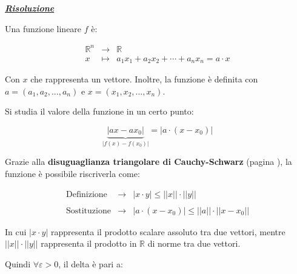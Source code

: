\documentclass[a4paper]{article}
\begin{document}
	\noindent
	\textcolor{Green4}{\textbf{\underline{\emph{Risoluzione}}}}\newline
	
	\noindent
	Una funzione lineare $f$ è:
	
	\begin{equation*}
		\begin{array}{lll}
			\mathbb{R}^{n}	& \longrightarrow & \mathbb{R} \\
			x				& \longmapsto	  & a_{1}x_{1} + a_{2}x_{2} + \cdots + a_{n}x_{n} = a \cdot x
		\end{array}
	\end{equation*}

	\noindent
	Con $x$ che rappresenta un vettore. Inoltre, la funzione è definita con $a = \left(a_{1}, a_{2}, ..., a_{n}\right)$ e $x = \left(x_{1}, x_{2}, ..., x_{n}\right)$.\newline
	
	\noindent
	Si studia il valore della funzione in un certo punto:
	
	\begin{equation*}
		\underbrace{\left|ax - ax_{0}\right|}_{\left|f\left(x\right) - f\left(x_{0}\right)\right|} = \left|a \cdot \left(x-x_{0}\right)\right|
	\end{equation*}

	\noindent
	Grazie alla \textcolor{Red3}{\textbf{disuguaglianza triangolare di Cauchy-Schwarz}} (pagina \pageref{disuguaglianza triangolare di cauchy-schwarz}), la funzione è possibile riscriverla come:
	
	\begin{equation*}
		\begin{array}{lll}
			\text{Definizione}	& \longrightarrow & \left|x \cdot y\right| \le \Big||x|\Big| \cdot \Big||y|\Big| \\
			&& \\
			\text{Sostituzione}	& \longrightarrow & \left|a \cdot \left(x-x_{0}\right)\right| \le \Big||a|\Big| \cdot \Big||x-x_{0}|\Big|
		\end{array}
	\end{equation*}

	\noindent
	In cui $\left|x \cdot y\right|$ rappresenta il prodotto scalare assoluto tra due vettori, mentre $\Big||x|\Big| \cdot \Big||y|\Big|$ rappresenta il prodotto in $\mathbb{R}$ di norme tra due vettori.\newline
	
	\noindent
	Quindi $\forall\varepsilon > 0$, il delta è pari a:
	
\end{document}
